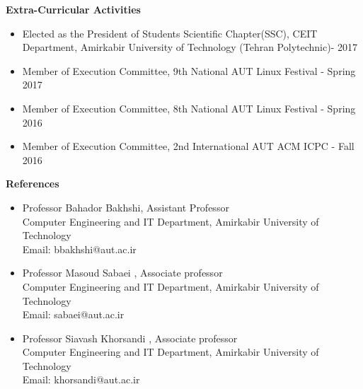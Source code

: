 \documentclass[a4paper,12pt,final]{memoir}
\newcommand{\SmallSep}{\vspace{0.5em}}
\newcommand{\CVSection}[1]
	{\Large\textbf{#1}\par
	\SmallSep\normalsize\normalfont}
\begin{document}
\CVSection{Extra-Curricular Activities}
	\begin{itemize}
		\item Elected as the President of Students Scientific Chapter(SSC), CEIT Department, Amirkabir University of Technology (Tehran Polytechnic)- 2017
		\item Member of Execution Committee, 9th National AUT Linux Festival - Spring 2017
		\item Member of Execution Committee, 8th National AUT Linux Festival - Spring 2016
		\item Member of Execution Committee, 2nd International AUT ACM ICPC - Fall 2016
		
	\end{itemize}
	
\CVSection{References}
	\begin{itemize}
		\item {Professor Bahador Bakhshi, Assistant Professor \\
Computer Engineering and IT Department, Amirkabir University of Technology\\
Email: bbakhshi@aut.ac.ir}

		\item {Professor Masoud Sabaei , Associate professor\\ 
		Computer Engineering and IT Department, Amirkabir University of Technology\\
Email: sabaei@aut.ac.ir } 
		\item {Professor Siavash Khorsandi , Associate professor\\ 
		Computer Engineering and IT Department, Amirkabir University of Technology\\
Email: khorsandi@aut.ac.ir }
	\end{itemize}
\end{document}
